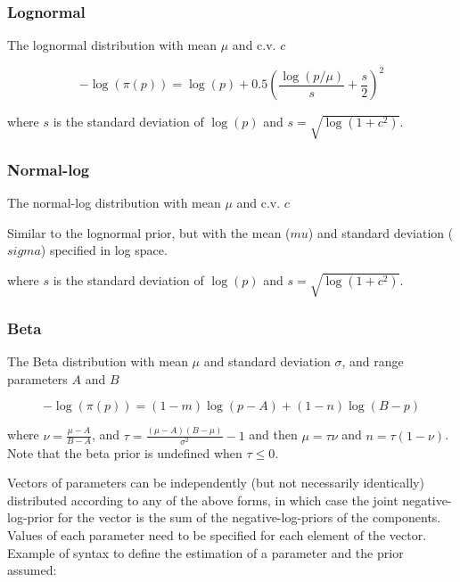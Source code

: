 \subsubsection{Lognormal}\label{sec:Prior-Lognormal}

The lognormal distribution with mean $\mu$ and c.v. $c$

\begin{equation}
 - \log \left(\pi \left(p \right) \right) = \log \left( p \right) + 0.5 \left( \frac{\log \left( p / \mu \right)}{s} + \frac{s}{2} \right)^2
\end{equation}

where $s$ is the standard deviation of $\log(p)$ and $s= \sqrt{\log \left(1+c^2 \right)}$.

\subsubsection{Normal-log}\label{sec:Prior-NormalLog}

The normal-log distribution  with mean $\mu$ and c.v. $c$

Similar to the lognormal prior, but with the mean ($mu$) and standard deviation ($sigma$) specified in log space.

where $s$ is the standard deviation of $\log(p)$ and $s= \sqrt{\log \left(1+c^2 \right)}$.


\subsubsection{Beta}\label{sec:Prior-Beta}

The Beta distribution with mean $\mu$ and standard deviation $\sigma$, and range parameters $A$ and $B$

\begin{equation}
 - \log \left(\pi \left( p \right) \right) = \left( 1 - m \right) \log \left( p - A \right) + \left( 1 - n \right)\log \left( B - p \right)
\end{equation}

where $\nu  = \frac{\mu  - A}{B - A}$, and $\tau = \frac{\left(\mu -A \right)\left(B - \mu \right)}{\sigma ^2} - 1$ and then $\mu=\tau \nu$ and $n=\tau(1-\nu)$. Note that the beta prior is undefined when $\tau \leq 0$.

Vectors of parameters can be independently (but not necessarily identically) distributed according to any of the above forms, in which case the joint negative-log-prior for the vector is the sum of the negative-log-priors of the components. Values of each parameter need to be specified for each element of the vector. Example of syntax to define the estimation of a parameter and the prior assumed:

